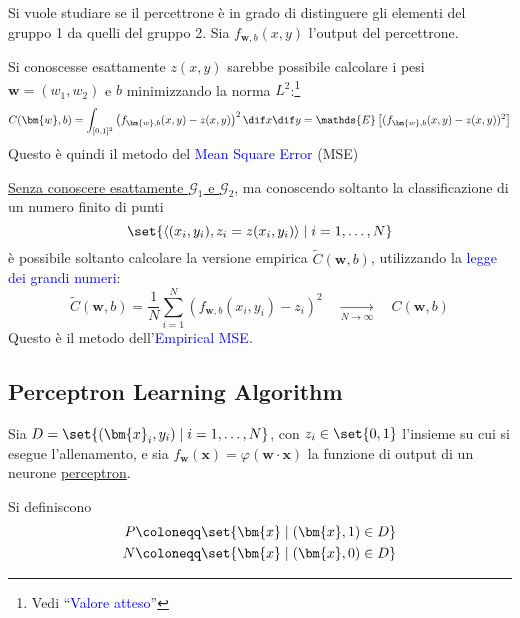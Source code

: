 \documentclass[10pt]{book}
\newcommand{\1}{\mathds{1}}
\newcommand{\media}{\mathds{E}}
\renewcommand{\tilde}[1]{\widetilde{#1}}
\theoremstyle{definition}%
\theoremstyle{plain}
\theoremstyle{remark}
\renewcommand{\href}[2]{\textcolor{blue}{#2}}
\begin{document}
Si vuole studiare se il percettrone è in grado di distinguere gli elementi del gruppo 1 da quelli del gruppo 2. Sia \(f_{\bm{w},b}(x,y)\) l'output del percettrone.

Si conoscesse esattamente \(z(x,y)\) sarebbe possibile calcolare i pesi \(\bm{w}=(w_{1},w_{2})\) e \(b\) minimizzando la norma \(L^{2}\):\footnote{Vedi ``\href{../../../../../org/roam/20250710140734-valore_atteso.org}{Valore atteso}''}
\begin{equation*}
C(\bm{w},b) = \int_{[0,1]^{2}}\left(f_{\bm{w},b}(x,y)-z(x,y)\right)^{2}\dif x\dif y = \media\left[{(f_{\bm{w},b}(x,y)-z(x,y))^{2}}\right]
\end{equation*}
Questo è quindi il metodo del \href{../../../../../org/roam/20250710141709-mean_square_error.org}{Mean Square Error} (MSE)

\uline{Senza conoscere esattamente \(\mathcal{G}_{1}\) e \(\mathcal{G}_{2}\)}, ma conoscendo soltanto la classificazione di un numero finito di punti
\begin{equation*}
\set{\langle(x_{i},y_{i}), z_{i} = z(x_{i},y_{i})\rangle\mid i=1,\dots,N}
\end{equation*}
è possibile soltanto calcolare la versione empirica \(\tilde{C}(\bm{w},b)\), utilizzando la \href{../../../../../org/roam/20250710140836-legge_dei_grandi_numeri.org}{legge dei grandi numeri}:
\begin{equation*}
\tilde{C}(\bm{w},b) = \frac{1}{N}\sum_{i=1}^{N}\left(f_{\bm{w},b}(x_{i},y_{i})-z_{i}\right)^{2}\hspace{1em} \xrightarrow[N\to\infty]{}\hspace{1em} C(\bm{w},b)
\end{equation*}
Questo è il metodo dell'\href{../../../../../org/roam/20250710141709-mean_square_error.org}{Empirical MSE}.
\subsection{Perceptron Learning Algorithm}
\label{sec:orgede799b}
Sia \(D=\set{(\bm{x}_{i},y_{i})\mid i =1,\dots,N}\), con \(z_{i} \in \set{0,1}\) l'insieme su cui si esegue l'allenamento, e sia \(f_{\bm{w}}(\bm{x})=\varphi(\bm{w}\cdot \bm{x})\) la funzione di output di un neurone \hyperref[sec:orgeb1a924]{perceptron}.

Si definiscono
\begin{align*}
P&\coloneqq \set{\bm{x}\mid (\bm{x},1) \in D}\\
N&\coloneqq \set{\bm{x} \mid (\bm{x},0) \in D}
\end{align*}
\end{document}
